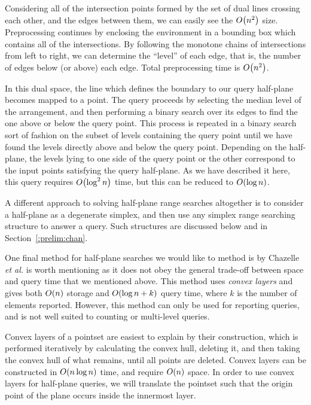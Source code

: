 Considering all of the intersection points formed by the set of dual lines crossing each other, and the edges between them, we can easily see the $O\!\left(n^2\right)$ size.
Preprocessing continues by enclosing the environment in a bounding box which contains all of the intersections.
By following the monotone chains of intersections from left to right, we can determine the ``level'' of each edge, that is, the number of edges below (or above) each edge.
Total preprocessing time is $O\!\left(n^2\right)$.

In this dual space, the line which defines the boundary to our query half-plane becomes mapped to a point.
The query proceeds by selecting the median level of the arrangement, and then performing a binary search over its edges to find the one above or below the query point.
This process is repeated in a binary search sort of fashion on the subset of levels containing the query point until we have found the levels directly above and below the query point. 
Depending on the half-plane, the levels lying to one side of the query point or the other correspond to the input points satisfying the query half-plane.
As we have described it here, this query requires $O\!\left(\log^2{n}\right)$ time, but this can be reduced to $O\!\left(\log{n}\right)$.\cite{NandyDG03}

A different approach to solving half-plane range searches altogether is to consider a half-plane as a degenerate simplex, and then use any simplex range searching structure to answer a query.  
Such structures are discussed below and in Section~\ref{:prelim:chan}.

One final method for half-plane searches we would like to method is by Chazelle \emph{et al.}\cite{ChazelleGL85,Chazelle85} is worth mentioning as it does not obey the general trade-off between space and query time that we mentioned above.
This method uses \emph{convex layers} and gives both $O\!\left(n\right)$ storage and $O\!\left(\log{n} + k\right)$ query time, where $k$ is the number of elements reported. 
However, this method can only be used for reporting queries, and is not well suited to counting or multi-level queries.

Convex layers of a pointset are easiest to explain by their construction, which is performed iteratively by calculating the convex hull, deleting it, and then taking the convex hull of what remains, until all points are deleted.
Convex layers can be constructed in $O\!\left(n\log{n}\right)$ time, and require $O\!\left(n\right)$ space.
In order to use convex layers for half-plane queries, we will translate the pointset such that the origin point of the plane occurs inside the innermost layer.

